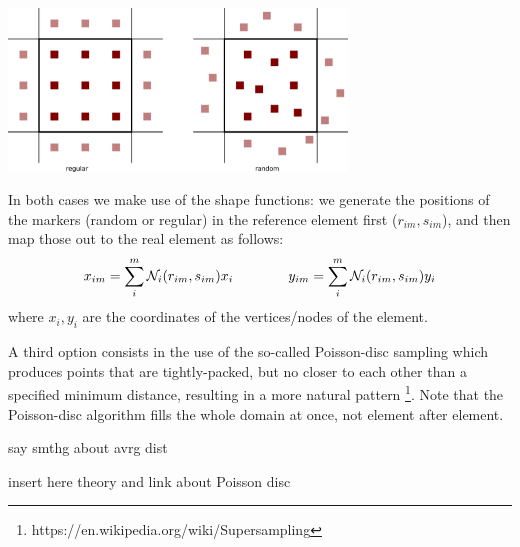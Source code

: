 \begin{center}
\includegraphics[width=9cm]{python_codes/fieldstone_13/images/markers} 
\end{center}

In both cases we make use of the shape functions: we generate the 
positions of the markers (random or regular) in the reference
element first ($r_{im},s_{im}$), and then map those out to the real element as follows:
\begin{equation}
x_{im}=\sum_i^m {\mathcal{N}}_i(r_{im},s_{im}) x_i
\quad\quad\quad\quad
y_{im}=\sum_i^m {\mathcal{N}}_i(r_{im},s_{im}) y_i
\end{equation}
where $x_i,y_i$ are the coordinates of the vertices/nodes of the element.

A third option consists in the use of the so-called Poisson-disc sampling which 
produces points that are tightly-packed, but no closer to each other than 
a specified minimum distance, resulting in a more natural pattern 
\footnote{https://en.wikipedia.org/wiki/Supersampling}. Note that 
the Poisson-disc algorithm fills the whole domain at once, not element after element.

{\color{red} say smthg about avrg dist}  

{\color{red} insert here theory and link about Poisson disc }

